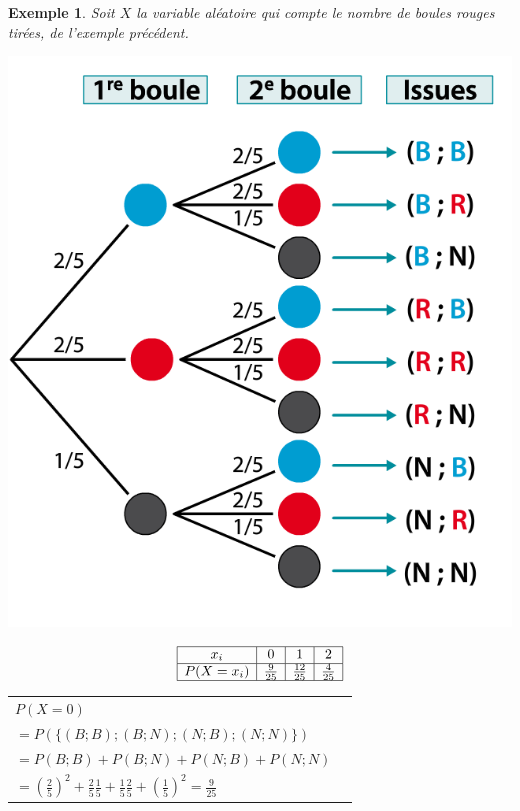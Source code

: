 \documentclass[a4paper,11pt]{article}
\theoremstyle{break}
\newcounter{enonce}
\newtheorem{exemple}[enonce]{Exemple}
\renewcommand\arraystretch{1.3}
\renewcommand\arraystretch{1.8}
\begin{document}
    \begin{exemple}
    Soit $X$ la variable aléatoire qui compte le nombre de boules rouges tirées, de l'exemple précédent.

    \begin{multicols}{2} 
 
 \includegraphics[scale=0.5]{../Images/issues.png}
 
 \renewcommand{\arraystretch}{2.2}
 $$
\begin{array}{|c|c|c|c|}

\hline
    x_i&0&1&2\\
    \hline
    P(X=x_i)&\frac{9}{25}&\frac{12}{25}&\frac{4}{25}\\
    \hline
    \end{array} 
$$  
 
\columnbreak 
 
 \small 
\begin{tabular}{ll}
    $P(X=0)$\\
    $=P(\lbrace(B;B);(B;N);(N;B);(N;N)\rbrace)$ \\
    $=P(B;B)+P(B;N)+P(N;B)+P(N;N)$\\
    $=(\frac{2}{5})^2+\frac{2}{5}\frac{1}{5}+\frac{1}{5}\frac{2}{5}+(\frac{1}{5})^2=\frac{9}{25}$\\
    \end{tabular}
    

\end{multicols}
\end{exemple}
\end{document}
